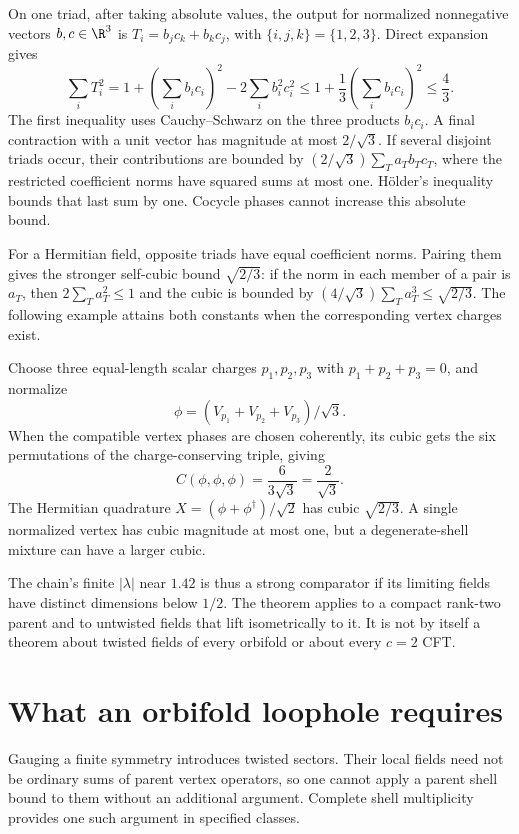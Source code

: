 On one triad, after taking absolute values, the output for normalized
nonnegative vectors $b,c\in\R^3$ is
$T_i=b_jc_k+b_kc_j$, with $\{i,j,k\}=\{1,2,3\}$. Direct expansion
gives
\[
 \sum_iT_i^2
 =1+\left(\sum_ib_ic_i\right)^2-2\sum_ib_i^2c_i^2
 \leq1+\frac13\left(\sum_ib_ic_i\right)^2\leq\frac43.
\]
The first inequality uses Cauchy--Schwarz on the three products
$b_ic_i$. A final contraction with a unit vector has magnitude at
most $2/\sqrt3$. If several disjoint triads occur, their contributions
are bounded by $(2/\sqrt3)\sum_Ta_Tb_Tc_T$, where the restricted
coefficient norms have squared sums at most one. H\"older's
inequality bounds that last sum by one. Cocycle phases cannot
increase this absolute bound.

For a Hermitian field, opposite triads have equal coefficient norms.
Pairing them gives the stronger self-cubic bound $\sqrt{2/3}$:
if the norm in each member of a pair is $a_T$, then
$2\sum_Ta_T^2\leq1$ and the cubic is bounded by
$(4/\sqrt3)\sum_Ta_T^3\leq\sqrt{2/3}$. The following example
attains both constants when the corresponding vertex charges exist.

\begin{example}
Choose three equal-length scalar charges $p_1,p_2,p_3$ with
$p_1+p_2+p_3=0$, and normalize
\[
 \phi=(V_{p_1}+V_{p_2}+V_{p_3})/\sqrt3.
\]
When the compatible vertex phases are chosen coherently, its cubic
gets the six permutations of the charge-conserving triple, giving
\[
 C(\phi,\phi,\phi)=\frac6{3\sqrt3}=\frac2{\sqrt3}.
\]
The Hermitian quadrature $X=(\phi+\phi^\dagger)/\sqrt2$ has cubic
$\sqrt{2/3}$. A single normalized vertex has cubic magnitude at
most one, but a degenerate-shell mixture can have a larger cubic.
\end{example}

The chain's finite $|\lambda|$ near $1.42$ is thus a strong comparator
if its limiting fields have distinct dimensions below $1/2$. The
theorem applies to a compact rank-two parent and to untwisted fields
that lift isometrically to it. It is not by itself a theorem about
twisted fields of every orbifold or about every $c=2$ CFT.

\section{What an orbifold loophole requires}

Gauging a finite symmetry introduces twisted sectors. Their local fields
need not be ordinary sums of parent vertex operators, so one cannot
apply a parent shell bound to them without an additional argument.
Complete shell multiplicity provides one such argument in specified
classes.

